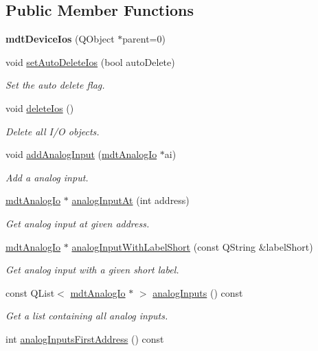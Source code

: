 \subsection*{Public Member Functions}
\begin{DoxyCompactItemize}
\item 
\hypertarget{classmdt_device_ios_a44939a10d66421069bdd4b8717e2798c}{
{\bfseries mdtDeviceIos} (QObject $\ast$parent=0)}
\label{classmdt_device_ios_a44939a10d66421069bdd4b8717e2798c}

\item 
void \hyperlink{classmdt_device_ios_af771f8080ce4a7260baa0acccacae0e1}{setAutoDeleteIos} (bool autoDelete)
\begin{DoxyCompactList}\small\item\em Set the auto delete flag. \end{DoxyCompactList}\item 
void \hyperlink{classmdt_device_ios_a272fc1fa86e1b66e6af0e58b130939e0}{deleteIos} ()
\begin{DoxyCompactList}\small\item\em Delete all I/O objects. \end{DoxyCompactList}\item 
void \hyperlink{classmdt_device_ios_a0e2683630eff9410003a36ae5af76b52}{addAnalogInput} (\hyperlink{classmdt_analog_io}{mdtAnalogIo} $\ast$ai)
\begin{DoxyCompactList}\small\item\em Add a analog input. \end{DoxyCompactList}\item 
\hyperlink{classmdt_analog_io}{mdtAnalogIo} $\ast$ \hyperlink{classmdt_device_ios_a70a3d979ec5d44297e8195e37596d5bc}{analogInputAt} (int address)
\begin{DoxyCompactList}\small\item\em Get analog input at given address. \end{DoxyCompactList}\item 
\hyperlink{classmdt_analog_io}{mdtAnalogIo} $\ast$ \hyperlink{classmdt_device_ios_ae31753e23d7ab14073f852dca85c2f9e}{analogInputWithLabelShort} (const QString \&labelShort)
\begin{DoxyCompactList}\small\item\em Get analog input with a given short label. \end{DoxyCompactList}\item 
const QList$<$ \hyperlink{classmdt_analog_io}{mdtAnalogIo} $\ast$ $>$ \hyperlink{classmdt_device_ios_aab70f76d2107f0a9324a9b9d4db21532}{analogInputs} () const 
\begin{DoxyCompactList}\small\item\em Get a list containing all analog inputs. \end{DoxyCompactList}\item 
\hypertarget{classmdt_device_ios_a42f0f52b4bf81c3ef2f89c6512fbbf89}{
int \hyperlink{classmdt_device_ios_a42f0f52b4bf81c3ef2f89c6512fbbf89}{analogInputsFirstAddress} () const }
\label{classmdt_device_ios_a42f0f52b4bf81c3ef2f89c6512fbbf89}


\end{DoxyCompactItemize}
